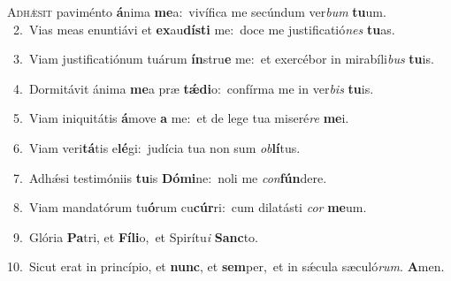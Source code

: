 \lettrine{\initial\textcolor{\initialcolor}{A}}{dhǽsit} paviménto \textbf{á}\-nima \textbf{me}\-a:~\star vivífica me secúndum ver\textit{bum} \textbf{tu}\-um.\\
{\numbfont\textcolor{\numbcolor}{~2.}}~Vias meas enuntiávi et \textbf{ex}\-au\-\textbf{dís}\-\textbf{ti} me:~\star doce me justificatió\textit{nes} \textbf{tu}\-as.\par
{\numbfont\textcolor{\numbcolor}{~3.}}~Viam justificatiónum tuárum \textbf{ín}\-stru\textbf{e} me:~\star et exercébor in mirabíli\textit{bus} \textbf{tu}\-is.\par
{\numbfont\textcolor{\numbcolor}{~4.}}~Dormitávit ánima \textbf{me}\-a præ \textbf{tǽ}\-\textbf{di}o:~\star confírma me in ver\textit{bis} \textbf{tu}\-is.\par
{\numbfont\textcolor{\numbcolor}{~5.}}~Viam iniquitátis \textbf{á}\-move \textbf{a} me:~\star et de lege tua miseré\textit{re} \textbf{me}\-i.\par
{\numbfont\textcolor{\numbcolor}{~6.}}~Viam veri\-\textbf{tá}\-tis e\-\textbf{lé}\-gi:~\star judícia tua non sum \textit{ob}\-\textbf{lí}tus.\par
{\numbfont\textcolor{\numbcolor}{~7.}}~Adhǽsi testimóniis \textbf{tu}\-is \textbf{Dó}\-\textbf{mi}ne:~\star noli me \textit{con}\-\textbf{fún}dere.\par
{\numbfont\textcolor{\numbcolor}{~8.}}~Viam mandatórum tu\-\textbf{ó}\-rum cu\-\textbf{cúr}\-ri:~\star cum dilatásti \textit{cor} \textbf{me}\-um.\par
{\numbfont\textcolor{\numbcolor}{~9.}}~Glória \textbf{Pa}\-tri, et \textbf{Fí}\-\textbf{li}o,~\star et Spirítu\textit{i} \textbf{Sanc}\-to.\par
{\numbfont\textcolor{\numbcolor}{10.}}~Sicut erat in princípio, et \textbf{nunc}\-, et \textbf{sem}\-per,~\star et in sǽcula sæculó\-\textit{rum}\-. \textbf{A}\-men.\par
